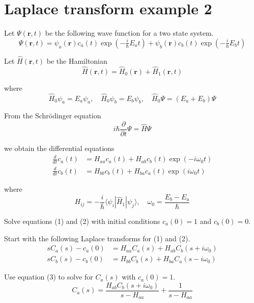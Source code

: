 

\section*{Laplace transform example 2}

Let $\Psi(\mathbf r,t)$ be the following wave function for a two state system.
\begin{equation*}
\Psi(\mathbf r,t)=\psi_a(\mathbf r)c_a(t)\exp(-\tfrac{i}{\hbar}E_at)+
\psi_b(\mathbf r)c_b(t)\exp(-\tfrac{i}{\hbar}E_bt)
\end{equation*}

Let $\hat H(\mathbf r,t)$ be the Hamiltonian
\begin{equation*}
\hat H(\mathbf r,t)=\hat H_0(\mathbf r)+\hat H_1(\mathbf r,t)
\end{equation*}

where
\begin{equation*}
\hat H_0\psi_a=E_a\psi_a,\quad\hat H_0\psi_b=E_b\psi_b,\quad
\hat H_0\Psi=(E_a+E_b)\Psi
\end{equation*}

From the Schr\"odinger equation
\begin{equation*}
i\hbar\frac{\partial}{\partial t}\Psi=\hat H\Psi
\end{equation*}

we obtain the differential equations
\begin{align*}
\frac{d}{dt}c_a(t)&=H_{aa}c_a(t)+H_{ab}c_b(t)\exp(-i\omega_0t)
\tag{1}
\\[1ex]
\frac{d}{dt}c_b(t)&=H_{bb}c_b(t)+H_{ba}c_a(t)\exp(i\omega_0t)
\tag{2}
\end{align*}

where
\begin{equation*}
H_{ij}=-\frac{i}{\hbar}\langle\psi_i|\hat H_1|\psi_j\rangle,\quad
\omega_0=\frac{E_b-E_a}{\hbar}
\end{equation*}

Solve equations (1) and (2) with initial conditions $c_a(0)=1$ and $c_b(0)=0$.

\bigskip
Start with the following Laplace transforms for (1) and (2).
\begin{align*}
sC_a(s)-c_a(0)&=H_{aa}C_a(s)+H_{ab}C_b(s+i\omega_0)
\tag{3}
\\
sC_b(s)-c_b(0)&=H_{bb}C_b(s)+H_{ba}C_a(s-i\omega_0)
\tag{4}
\end{align*}

Use equation (3) to solve for $C_a(s)$ with $c_a(0)=1$.
\begin{equation*}
C_a(s)=\frac{H_{ab}C_b(s+i\omega_0)}{s-H_{aa}}+\frac{1}{s-H_{aa}}
\end{equation*}

